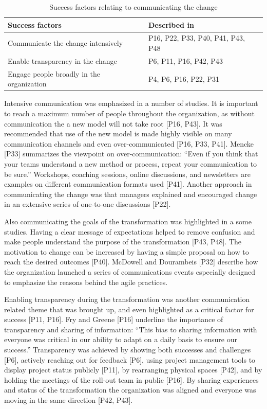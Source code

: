 \documentclass[preprint,authoryear,12pt]{elsarticle}
\begin{document}
\begin{table}[h]
    \centering
    \begin{tabular}{ >{\raggedright\arraybackslash}p{}
                     >{\raggedright\arraybackslash}p{} }
        \toprule
        Success factors  &  Described in \\
        \midrule
        Communicate the change intensively  &
                P16, P22, P33, P40, P41, P43, P48  \\
        Enable transparency in the change  &
                P6, P11, P16, P42, P43  \\
        Engage people broadly in the organization  &
                P4, P6, P16, P22, P31 \\
        \bottomrule
    \end{tabular}
    \caption{Success factors relating to communicating the change}
    \label{table:success_communication}
\end{table}


Intensive communication was emphasized in a number of studies. It is important
to reach a maximum number of people throughout the organization, as without
communication the a new model will not take root [P16, P43].
It was recommended that use of the new model is made highly visible on many
communication channels and even over-communicated [P16, P33, P41]. Mencke [P33]
summarizes the viewpoint on over-communication: ``Even if you think that your
teams understand a new method or process, repeat your communication to be
sure.'' Workshops, coaching sessions, online discussions, and newsletters are
examples on different communication formats used [P41]. Another approach in
communicating the change was that managers explained and encouraged change in an
extensive series of one-to-one discussions [P22].

Also communicating the goals of the transformation was highlighted in a some
studies.
Having a clear message of expectations helped to remove confusion and make
people understand the purpose of the transformation [P43, P48]. The motivation
to change can be increased by having a simple proposal on how to reach the
desired outcomes [P40].
McDowell and Dourambeis [P32] describe how the organization launched a series of
communications events especially designed to emphasize the reasons behind the
agile practices.

Enabling transparency during the transformation was another communication
related theme that was brought up, and even highlighted as a critical factor for
success [P11, P16]. Fry and Greene [P16] underline the importance of
transparency and sharing of information: ``This bias to sharing information with
everyone was critical in our ability to adapt on a daily basis to ensure our
success.'' Transparency was achieved by showing both successes and challenges
[P6], actively reaching out for feedback [P6], using project management tools to
display project status publicly [P11], by rearranging physical spaces [P42], and
by holding the meetings of the roll-out team in public [P16].
By sharing experiences and status of the transformation the organization was
aligned and everyone was moving in the same direction [P42, P43].
\end{document}
